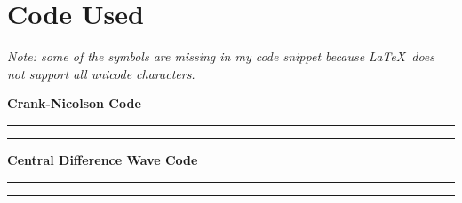 \documentclass[a4paper,12pt]{article}
\begin{document}
\newpage
\section*{Code Used}

\emph{Note: some of the symbols are missing in my code snippet because \LaTeX\ does not support all unicode characters.}

\textbf{Crank-Nicolson Code}

\vspace{-0.5cm}
\rule{\textwidth}{.4pt}

\rule{\textwidth}{.4pt}

\newpage
\textbf{Central Difference Wave Code}

\vspace{-0.5cm}
\rule{\textwidth}{.4pt}

\rule{\textwidth}{.4pt}
\end{document}

